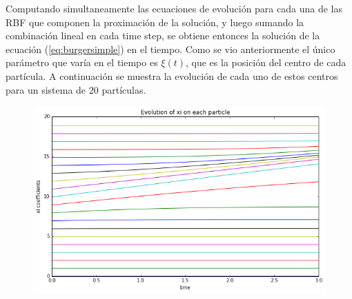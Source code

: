﻿\documentclass[spanish, fleqn]{article}
\begin{document}
    Computando simultaneamente las ecuaciones de evolución para cada una de las RBF que componen la proximación de la solución, y luego sumando la combinación lineal en cada time step, se obtiene entonces la solución de la ecuación (\ref{eq:burgersimple}) en el tiempo. Como se vio anteriormente el único parámetro que varía en el tiempo es $\xi(t)$, que es la posición del centro de cada partícula. A continuación se muestra la evolución de cada uno de estos centros para un sistema de $20$ partículas.
    \begin{figure}
      \centering
      \includegraphics[scale=0.5]{xis.png}
    \end{figure}
    
\end{document}
